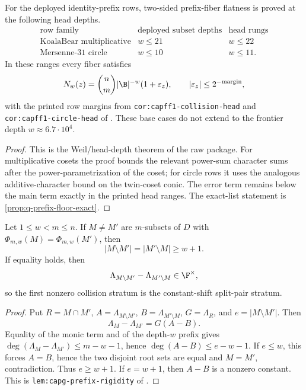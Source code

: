 \begin{proposition}
\label{prop:q-head-depth}
For the deployed identity-prefix rows, two-sided prefix-fiber flatness is
proved at the following head depths.
\[
\begin{array}{c|c|c}
\text{row family} & \text{deployed subset depths} & \text{head rungs}\\
\hline
\text{KoalaBear multiplicative} & w\le 21 & w\le 22\\
\text{Mersenne-31 circle} & w\le 10 & w\le 11 .
\end{array}
\]
In these ranges every fiber satisfies
\[
        N_w(z)=\binom{n}{m}|\B|^{-w}(1+\varepsilon_z),
        \qquad |\varepsilon_z|\le 2^{-\mathrm{margin}},
\]
with the printed row margins from \texttt{cor:capff1-collision-head} and
\texttt{cor:capff1-circle-head} of \cite{CAP25v13}.  These base cases do not
extend to the frontier depth \(w\approx 6.7\cdot 10^4\).
\end{proposition}

\begin{proof}
This is the Weil/head-depth theorem of the raw package.  For multiplicative
cosets the proof bounds the relevant power-sum character sums after the
power-parametrization of the coset; for circle rows it uses the analogous
additive-character bound on the twin-coset conic.  The error term remains below
the main term exactly in the printed head ranges.  The exact-list statement is
\cref{prop:q-prefix-floor-exact}.
\end{proof}

\begin{proposition}\label{prop:q-prefix-rigidity}
Let \(1\le w<m\le n\).  If \(M\ne M'\) are \(m\)-subsets of \(D\) with
\(\Phi_{m,w}(M)=\Phi_{m,w}(M')\), then
\[
        |M\setminus M'|=|M'\setminus M|\ge w+1.
\]
If equality holds, then
\[
        \Lambda_{M\setminus M'}-\Lambda_{M'\setminus M}
        \in\F^\times ,
\]
so the first nonzero collision stratum is the constant-shift split-pair
stratum.
\end{proposition}

\begin{proof}
Put \(R=M\cap M'\), \(A=\Lambda_{M\setminus M'}\),
\(B=\Lambda_{M'\setminus M}\), \(G=\Lambda_R\), and
\(e=|M\setminus M'|\).  Then
\[
        \Lambda_M-\Lambda_{M'}=G(A-B).
\]
Equality of the monic term and of the depth-\(w\) prefix gives
\(\deg(\Lambda_M-\Lambda_{M'})\le m-w-1\), hence
\(\deg(A-B)\le e-w-1\).  If \(e\le w\), this forces \(A=B\), hence the two
disjoint root sets are equal and \(M=M'\), contradiction.  Thus \(e\ge w+1\).
If \(e=w+1\), then \(A-B\) is a nonzero constant.  This is
\texttt{lem:capg-prefix-rigidity} of \cite{CAP25v13}.
\end{proof}

